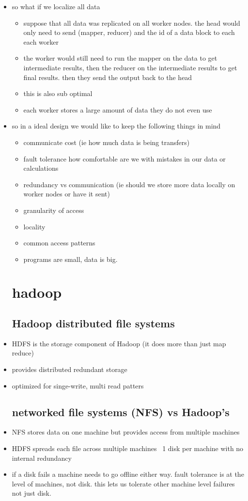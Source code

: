 \documentclass{article}
\begin{document}
\begin{itemize}
\begin{itemize}
\end{itemize}
\item so what if we localize all data 
\begin{itemize}
    \item suppose that all data was replicated on all worker nodes. 
    \itme the head would only need to send (mapper, reducer) and the id of a data block to each each worker 
    \item the worker would still need to run the mapper on the data to get intermediate results, then the reducer on the intermediate results to get final results. then they send the output back to the head 
\end{itemize}
\begin{itemize}
    \item this is also sub optimal 
    \item each worker stores a large amount of data they do not even use 
\end{itemize}
\item so in a ideal design we would like to keep the following things in mind  
\begin{itemize}
    \item communicate cost (ie how much data is being transfers)
    \item fault tolerance how comfortable are we with mistakes in our data or calculations 
    \item redundancy vs communication (ie should we store more data locally on worker nodes or have it sent)
    \item granularity of access
    \item locality
    \item common access patterns 
    \item programs are small, data is big. 
\end{itemize}
\section{hadoop}
\subsection{Hadoop distributed file systems}
\item HDFS is the storage component of Hadoop (it does more than just map reduce) 
\item provides distributed redundant storage
\item optimized for singe-write, multi read patters
\subsection{networked file systems (NFS) vs Hadoop's}
\item NFS stores data on one machine but provides access from multiple machines
\item HDFS spreads each file across multiple machines ~1 disk per machine with no internal redundancy
\item if a disk fails a machine needs to go offline either way. fault tolerance is at the level of machines, not disk. this lets us tolerate other machine level failures not just disk. 

\end{itemize}
\end{document}
